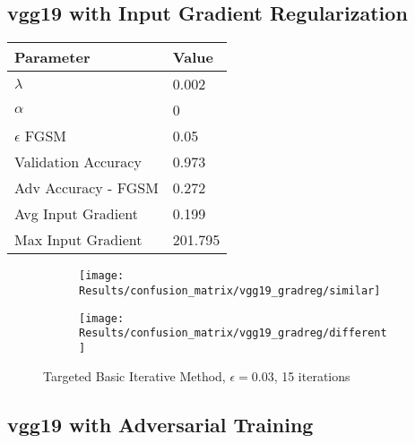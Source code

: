 \documentclass[draft,final]{vutinfth} %
\begin{document}
\subsection{vgg19 with Input Gradient Regularization}

\begin{table}[h]
  \centering
  \begin{tabular}{ll}
    \toprule
			Parameter			& Value   \\
    \midrule
			$\lambda$								& 0.002				\\
			$\alpha$								& 0				\\
			$\epsilon$ FGSM					& 0.05		\\
			
			Validation Accuracy			& 0.973		\\ 
			Adv Accuracy - FGSM			& 0.272		\\
			
			Avg Input Gradient			& 0.199		\\
			Max Input Gradient			& 201.795	\\
    \bottomrule
  \end{tabular}
\end{table}


\begin{figure}[h]
  \begin{subfigure}[b]{0.75\columnwidth}
		\centering
    \texttt{[image: Results/confusion\_matrix/vgg19\_gradreg/similar]}
    \label{fig:exp:cm:vgg19_gradreg:similar}
  \end{subfigure}
  \begin{subfigure}[b]{0.75\columnwidth}
		\centering
    \texttt{[image: Results/confusion\_matrix/vgg19\_gradreg/different]}
    \label{fig:exp:cm:vgg19_gradreg:different}
  \end{subfigure}
  \caption{Targeted Basic Iterative Method, $\epsilon = 0.03$, 15 iterations}
  \label{fig:exp:cm:vgg19_gradreg}
\end{figure}

\subsection{vgg19 with Adversarial Training}
\end{document}
